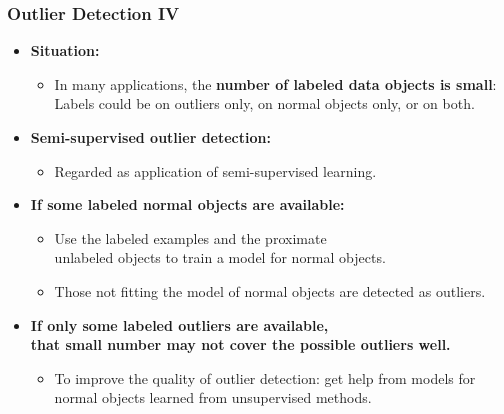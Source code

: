 \begin{frame}
	\frametitle{Outlier Detection IV}
	\begin{itemize}
		\item \textbf{Situation:}
		      \begin{itemize}
			      \item In many applications, the \textbf{\color{airforceblue}number of labeled data objects is small}:\\
			            Labels could be on outliers only, on normal objects only, or on both.
		      \end{itemize}
		\item \textbf{Semi-supervised outlier detection:}
		      \begin{itemize}
			      \item Regarded as application of semi-supervised learning.
		      \end{itemize}
		\item \textbf{If some {\color{airforceblue}labeled normal objects} are available:}
		      \begin{itemize}
			      \item Use the labeled examples and the proximate \\
			            unlabeled objects to train a model for normal objects.
			      \item Those not fitting the model of normal objects are detected as outliers.
		      \end{itemize}
		\item \textbf{If only some {\color{airforceblue}labeled outliers} are available, \\ that small number may not cover the possible outliers well.}
		      \begin{itemize}
			      \item To improve the quality of outlier detection: get help from models for normal objects learned from unsupervised methods.
		      \end{itemize}
	\end{itemize}
\end{frame}


